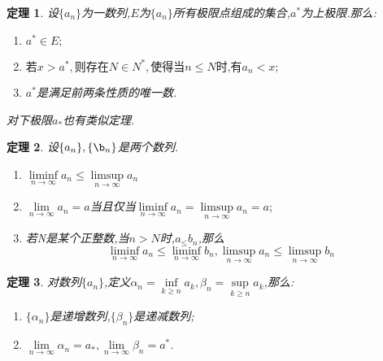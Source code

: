 \documentclass[UTF8]{ctexart}
\newtheorem{theorem}{定理}[section]
\begin{document}
	\begin{theorem}
		设$\{a_n\}$为一数列,$E$为$\{a_n\}$所有极限点组成的集合,$a^*$为上极限.那么:
		\begin{enumerate}
			\item $a^*\in E;$
			\item $\mbox{若} x>a^*,\mbox{则存在}N\in N^*,\mbox{使得当}n\leq N\mbox{时,有}a_n<x; $
			\item $a^*$是满足前两条性质的唯一数.
		\end{enumerate}
		对下极限$a_*$也有类似定理.
	\end{theorem}
	\begin{theorem}
		设$\{a_n\},\{\b_n\}$是两个数列.
	\begin{enumerate}
		\item $\liminf\limits_{n\to \infty} a_n\leq \limsup\limits_{n\to \infty} a_n$
		\item $\lim\limits_{n\to \infty}a_n=a$当且仅当$\liminf\limits_{n\to \infty}a_n=\limsup\limits_{n\to \infty}a_n=a;$
		\item 若\textup{N}是某个正整数,当$n>N$时,$a_\leq b_n$,那么\[\liminf\limits_{n\to \infty}a_n\leq\liminf\limits_{n\to \infty}b_n,\limsup\limits_{n\to \infty}a_n\leq\limsup\limits_{n\to \infty}b_n\]
	\end{enumerate}
	\end{theorem}
	\begin{theorem}
		对数列$\{a_n\}$,定义$\alpha_n=\inf\limits_{k\geq n}a_k,\beta_n=\sup\limits_{k\geq n}a_k$,那么:
		\begin{enumerate}
			\item $\{\alpha_n\}$是递增数列,$\{\beta_n\}$是递减数列;
			\item $\lim\limits_{n\to \infty}\alpha_n=a_*,\lim\limits_{n\to \infty}\beta_n=a^*$.
		\end{enumerate}
	\end{theorem}
\end{document}
